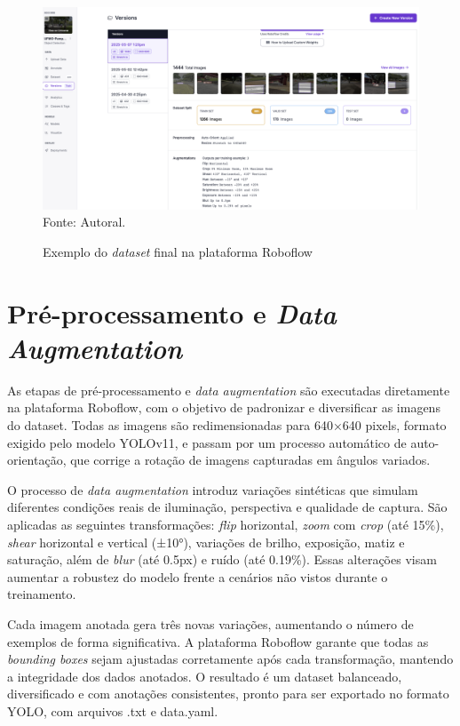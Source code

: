 \begin{figure}[htbp]
  \centering
  \caption{Exemplo do \textit{dataset} final na plataforma Roboflow}
  \includegraphics[width=1 \textwidth]{Figuras/dataset_roboflow.png}
  \\
  Fonte: Autoral.
  \label{fg-dataset-roboflow}
\end{figure}

\section{\textbf{Pré-processamento e \textit{Data Augmentation}}}

As etapas de pré-processamento e \textit{data augmentation} são executadas diretamente na plataforma Roboflow, com o objetivo de padronizar e diversificar as imagens do dataset. Todas as imagens são redimensionadas para 640×640 pixels, formato exigido pelo modelo YOLOv11, e passam por um processo automático de auto-orientação, que corrige a rotação de imagens capturadas em ângulos variados.

O processo de \textit{data augmentation} introduz variações sintéticas que simulam diferentes condições reais de iluminação, perspectiva e qualidade de captura. São aplicadas as seguintes transformações: \textit{flip} horizontal, \textit{zoom} com \textit{crop} (até 15\%), \textit{shear} horizontal e vertical (±10°), variações de brilho, exposição, matiz e saturação, além de \textit{blur} (até 0.5px) e ruído (até 0.19\%). Essas alterações visam aumentar a robustez do modelo frente a cenários não vistos durante o treinamento.

Cada imagem anotada gera três novas variações, aumentando o número de exemplos de forma significativa. A plataforma Roboflow garante que todas as \textit{bounding boxes} sejam ajustadas corretamente após cada transformação, mantendo a integridade dos dados anotados. O resultado é um dataset balanceado, diversificado e com anotações consistentes, pronto para ser exportado no formato YOLO, com arquivos .txt e data.yaml.

